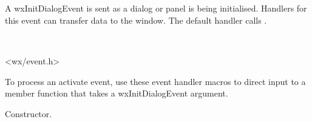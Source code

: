 \section{}\label{wxinitdialogevent}

A wxInitDialogEvent is sent as a dialog or panel is being initialised.
Handlers for this event can transfer data to the window.
The default handler calls .


\\


<wx/event.h>


To process an activate event, use these event handler macros to direct input to a member
function that takes a wxInitDialogEvent argument.

\twocolwidtha{7cm}
\begin{twocollist}\itemsep=0pt
\end{twocollist}




\label{wxinitdialogeventctor}


Constructor.


